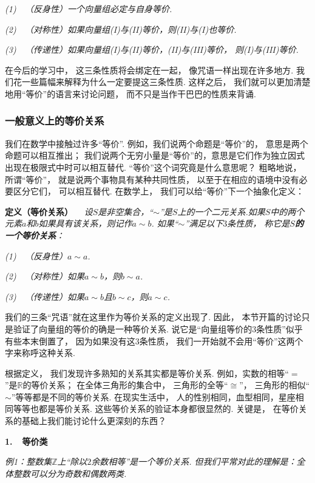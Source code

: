 \textit{(1)~~（反身性）一个向量组必定与自身等价.}

\textit{(2)~~（对称性）如果向量组(I)与(II)等价，则(II)与(I)也等价.}

\textit{(3)~~（传递性）如果向量组(I)与(II)等价，(II)与(III)等价，
则(I)与(III)等价.}  
\medskip

在今后的学习中，
这三条性质将会绑定在一起，
像咒语一样出现在许多地方.
我们花一些篇幅来解释为什么一定要提这三条性质.
这样之后，
我们就可以更加清楚地用“等价”的语言来讨论问题，
而不只是当作干巴巴的性质来背诵.


\subsubsection{一般意义上的等价关系}

我们在数学中接触过许多“等价”.
例如，我们说两个命题是“等价”的，
意思是两个命题可以相互推出；
我们说两个无穷小量是“等价”的，意思是它们作为独立因式出现在极限式中时可以相互替代.
“等价”这个词究竟是什么意思呢？
粗略地说，
所谓“等价”，
就是说两个事物具有某种共同性质，
以至于在相应的语境中没有必要区分它们，
可以相互替代.
在数学上，
我们可以给“等价”下一个抽象化定义：
\medskip

\textbf{定义（等价关系）}~~
\textit{设$S$是非空集合，“$\sim$”是$S$上的一个二元关系.如果$S$中的两个元素$a$和$b$如果具有该关系，则记作$a \sim b$.
如果“$\sim$”满足以下$3$条性质，
称它是\textbf{$S$的一个等价关系}：
}\hypertarget{equality}{}

\textit{(1)~~（反身性）$a \sim a$.}

\textit{(2)~~（对称性）如果$a \sim b$，则$b \sim a$.}

\textit{(3)~~（传递性）如果$a \sim b$且$b \sim c$，则$a \sim c$.}

\medskip

我们的三条“咒语”就在这里作为等价关系的定义出现了.
因此，
本节开篇的讨论只是验证了向量组的等价的确是一种等价关系.
说它是“向量组等价的$3$条性质”似乎有些本末倒置了，
因为如果没有这$3$条性质，
我们一开始就不会用“等价”这两个字来称呼这种关系.

根据定义，
我们发现许多熟知的关系其实都是等价关系.
例如，实数的相等“$=$”是$\mathbb{R}$的等价关系；
在全体三角形的集合中，
三角形的全等“$\cong$”，
三角形的相似“$\sim$”等等都是不同的等价关系.
在现实生活中，
人的性别相同，血型相同，星座相同等等也都是等价关系.
这些等价关系的验证本身都很显然的.
关键是，
在等价关系的基础上我们能讨论什么更深刻的东西？
\medskip

\textbf{1.~~等价类}

\textit{例1：整数集$\mathbb{Z}$上“除以$2$余数相等”是一个等价关系.
但我们平常对此的理解是：全体整数可以分为奇数和偶数两类.}

